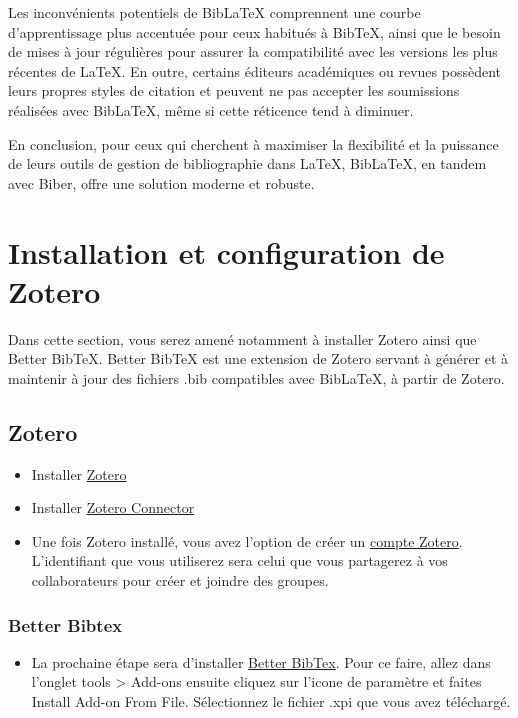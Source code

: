 \documentclass[
  letterpaper,
]{scrbook}
\providecommand{\tightlist}{%
  \setlength{\itemsep}{0pt}\setlength{\parskip}{0pt}}\usepackage{longtable,booktabs,array}
\begin{document}
Les inconvénients potentiels de BibLaTeX comprennent une courbe
d'apprentissage plus accentuée pour ceux habitués à BibTeX, ainsi que le
besoin de mises à jour régulières pour assurer la compatibilité avec les
versions les plus récentes de LaTeX. En outre, certains éditeurs
académiques ou revues possèdent leurs propres styles de citation et
peuvent ne pas accepter les soumissions réalisées avec BibLaTeX, même si
cette réticence tend à diminuer.

En conclusion, pour ceux qui cherchent à maximiser la flexibilité et la
puissance de leurs outils de gestion de bibliographie dans LaTeX,
BibLaTeX, en tandem avec Biber, offre une solution moderne et robuste.

\hypertarget{installation-et-configuration-de-zotero}{%
\section{Installation et configuration de
Zotero}\label{installation-et-configuration-de-zotero}}

Dans cette section, vous serez amené notamment à installer Zotero ainsi
que Better BibTeX. Better BibTeX est une extension de Zotero servant à
générer et à maintenir à jour des fichiers .bib compatibles avec
BibLaTeX, à partir de Zotero.

\hypertarget{zotero}{%
\subsection{Zotero}\label{zotero}}

\begin{itemize}
\item
  Installer \href{https://www.zotero.org/download/}{Zotero}
\item
  Installer \href{https://www.zotero.org/download/}{Zotero Connector}
\item
  Une fois Zotero installé, vous avez l'option de créer un
  \href{https://www.zotero.org/user/register/}{compte Zotero}.
  L'identifiant que vous utiliserez sera celui que vous partagerez à vos
  collaborateurs pour créer et joindre des groupes.
\end{itemize}

\hypertarget{better-bibtex}{%
\subsubsection{Better Bibtex}\label{better-bibtex}}

\begin{itemize}
\tightlist
\item
  La prochaine étape sera d'installer
  \href{https://retorque.re/zotero-better-bibtex/installation/}{Better
  BibTex}. Pour ce faire, allez dans l'onglet tools \textgreater{}
  Add-ons ensuite cliquez sur l'icone de paramètre et faites Install
  Add-on From File. Sélectionnez le fichier .xpi que vous avez
  téléchargé.
\end{itemize}
\end{document}
